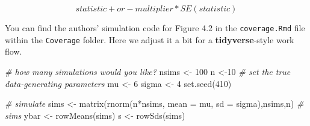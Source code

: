 \documentclass[
]{article}
\newenvironment{Shaded}{\begin{snugshade}}{\end{snugshade}}
\newcommand{\AttributeTok}[1]{\textcolor[rgb]{0.77,0.63,0.00}{#1}}
\newcommand{\CommentTok}[1]{\textcolor[rgb]{0.56,0.35,0.01}{\textit{#1}}}
\newcommand{\DecValTok}[1]{\textcolor[rgb]{0.00,0.00,0.81}{#1}}
\newcommand{\FunctionTok}[1]{\textcolor[rgb]{0.00,0.00,0.00}{#1}}
\newcommand{\NormalTok}[1]{#1}
\newcommand{\OtherTok}[1]{\textcolor[rgb]{0.56,0.35,0.01}{#1}}
\newcommand{\SpecialCharTok}[1]{\textcolor[rgb]{0.00,0.00,0.00}{#1}}
\begin{document}
\[ statistic + or - multiplier*SE(statistic)\]

You can find the authors' simulation code for Figure 4.2 in the
\texttt{coverage.Rmd} file within the \texttt{Coverage} folder. Here we
adjust it a bit for a \textbf{tidyverse}-style work flow.

\begin{Shaded}
\begin{Highlighting}[]
\CommentTok{\# how many simulations would you like?}
\NormalTok{nsims }\OtherTok{\textless{}{-}} \DecValTok{100}
\NormalTok{n }\OtherTok{\textless{}{-}}\DecValTok{10}
\CommentTok{\# set the true data{-}generating parameters}
\NormalTok{mu }\OtherTok{\textless{}{-}} \DecValTok{6}
\NormalTok{sigma }\OtherTok{\textless{}{-}} \DecValTok{4}
\FunctionTok{set.seed}\NormalTok{(}\DecValTok{410}\NormalTok{)}

\CommentTok{\# simulate}
\NormalTok{sims }\OtherTok{\textless{}{-}} \FunctionTok{matrix}\NormalTok{(}\FunctionTok{rnorm}\NormalTok{(n}\SpecialCharTok{*}\NormalTok{nsims, }\AttributeTok{mean =}\NormalTok{ mu, }\AttributeTok{sd =}\NormalTok{ sigma),nsims,n)}
\CommentTok{\# sims}
\NormalTok{ybar }\OtherTok{\textless{}{-}} \FunctionTok{rowMeans}\NormalTok{(sims)}
\NormalTok{s }\OtherTok{\textless{}{-}} \FunctionTok{rowSds}\NormalTok{(sims)}
\end{Highlighting}
\end{Shaded}
\end{document}

